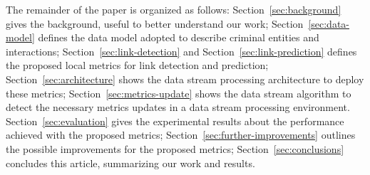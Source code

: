 The remainder of the paper is organized as follows:
Section~\ref{sec:background} gives the background, useful to better understand our work;
Section~\ref{sec:data-model} defines the data model adopted to describe criminal entities and interactions;
Section~\ref{sec:link-detection} and Section~\ref{sec:link-prediction} defines the proposed local metrics for link detection and prediction;
Section~\ref{sec:architecture} shows the data stream processing architecture to deploy these metrics;
Section~\ref{sec:metrics-update} shows the data stream algorithm to detect the necessary metrics updates in a data stream processing environment.
Section~\ref{sec:evaluation} gives the experimental results about the performance achieved with the proposed metrics;
Section~\ref{sec:further-improvements} outlines the possible improvements for the proposed metrics;
Section~\ref{sec:conclusions} concludes this article, summarizing our work and results.
